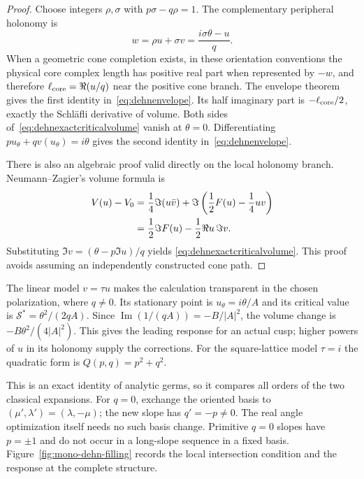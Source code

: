\begin{proof}
Choose integers $\rho,\sigma$ with $p\sigma-q\rho=1$.
The complementary peripheral holonomy is
\[
 w=\rho u+\sigma v=\frac{i\sigma\theta-u}{q}.
\]
When a geometric cone completion exists, in these orientation conventions
the physical core complex length
has positive real part when represented by $-w$, and therefore
$\ell_{\rm core}=\Re(u/q)$ near the positive cone branch.
The envelope theorem gives the first identity
in~\eqref{eq:dehnenvelope}. Its half imaginary part is
$-\ell_{\rm core}/2$, exactly the Schl\"afli derivative of volume.
Both sides of~\eqref{eq:dehnexactcriticalvolume} vanish at $\theta=0$.
Differentiating $pu_\theta+qv(u_\theta)=i\theta$ gives the second
identity in~\eqref{eq:dehnenvelope}.

There is also an algebraic proof valid directly on the local holonomy
branch. Neumann--Zagier's volume formula is
\begin{align}
 V(u)-V_0
 &=\frac14\Im(u\bar v)
     +\Im\left(\frac12F(u)-\frac14uv\right)\notag\\
 &=\frac12\Im F(u)-\frac12\Re u\,\Im v.
 \label{eq:NZrealvolume}
\end{align}
Substituting $\Im v=(\theta-p\Im u)/q$ yields
\eqref{eq:dehnexactcriticalvolume}. This proof avoids assuming
an independently constructed cone path.
\end{proof}

The linear model $v=\tau u$ makes the calculation transparent
in the chosen polarization, where $q\ne0$.
Its stationary point is $u_\theta=i\theta/A$ and its critical
value is $\mathcal S^*=\theta^2/(2qA)$. Since
$\operatorname{Im}(1/(qA))=-B/|A|^2$, the volume change is
$-B\theta^2/(4|A|^2)$. This gives the leading response for an
actual cusp; higher powers of $u$ in its holonomy supply the
corrections. For the square-lattice model $\tau=i$ the quadratic
form is $Q(p,q)=p^2+q^2$.

This is an exact identity of analytic germs, so it compares all
orders of the two classical expansions. For $q=0$, exchange the
oriented basis to $(\mu',\lambda')=(\lambda,-\mu)$; the new slope
has $q'=-p\ne0$. The real angle optimization itself needs no such
basis change. Primitive $q=0$ slopes have $p=\pm1$ and do not
occur in a long-slope sequence in a fixed basis.
Figure~\ref{fig:mono-dehn-filling} records the local intersection
condition and the response at the complete structure.

